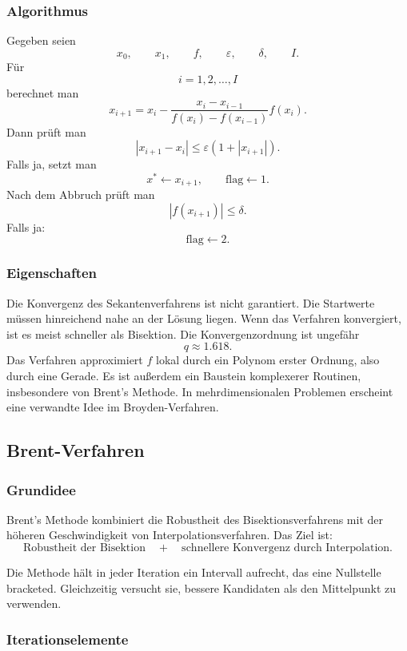 \documentclass[10pt, letterpaper]{article}
\begin{document}
\subsubsection{Algorithmus}

Gegeben seien
\[
x_0,\qquad x_1,\qquad f,\qquad \varepsilon,\qquad \delta,\qquad I.
\]
Für
\[
i=1,2,\dots,I
\]
berechnet man
\[
x_{i+1}
=
x_i
-
\frac{x_i-x_{i-1}}
{f(x_i)-f(x_{i-1})}
f(x_i).
\]
Dann prüft man
\[
|x_{i+1}-x_i|
\leq
\varepsilon(1+|x_{i+1}|).
\]
Falls ja, setzt man
\[
x^\ast\leftarrow x_{i+1},
\qquad
\text{flag}\leftarrow 1.
\]
Nach dem Abbruch prüft man
\[
|f(x_{i+1})|\leq \delta.
\]
Falls ja:
\[
\text{flag}\leftarrow 2.
\]

\subsubsection{Eigenschaften}

Die Konvergenz des Sekantenverfahrens ist nicht garantiert. Die Startwerte müssen hinreichend nahe an der Lösung liegen. Wenn das Verfahren konvergiert, ist es meist schneller als Bisektion. Die Konvergenzordnung ist ungefähr
\[
q\approx 1.618.
\]
Das Verfahren approximiert \(f\) lokal durch ein Polynom erster Ordnung, also durch eine Gerade. Es ist außerdem ein Baustein komplexerer Routinen, insbesondere von Brent's Methode. In mehrdimensionalen Problemen erscheint eine verwandte Idee im Broyden-Verfahren.

\subsection{Brent-Verfahren}

\subsubsection{Grundidee}

Brent's Methode kombiniert die Robustheit des Bisektionsverfahrens mit der höheren Geschwindigkeit von Interpolationsverfahren. Das Ziel ist:
\[
\text{Robustheit der Bisektion}
\quad+\quad
\text{schnellere Konvergenz durch Interpolation}.
\]

Die Methode hält in jeder Iteration ein Intervall aufrecht, das eine Nullstelle bracketed. Gleichzeitig versucht sie, bessere Kandidaten als den Mittelpunkt zu verwenden.

\subsubsection{Iterationselemente}
\end{document}
